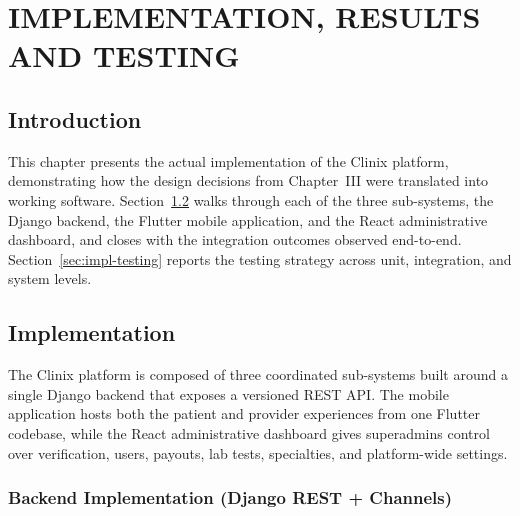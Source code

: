 \chapter{IMPLEMENTATION, RESULTS AND TESTING}

\section{Introduction}

This chapter presents the actual implementation of the Clinix platform, demonstrating how the design decisions from Chapter~III were translated into working software. Section~\ref{sec:impl-implementation} walks through each of the three sub-systems, the Django backend, the Flutter mobile application, and the React administrative dashboard, and closes with the integration outcomes observed end-to-end. Section~\ref{sec:impl-testing} reports the testing strategy across unit, integration, and system levels.

\section{Implementation}
\label{sec:impl-implementation}

The Clinix platform is composed of three coordinated sub-systems built around a single Django backend that exposes a versioned REST API. The mobile application hosts both the patient and provider experiences from one Flutter codebase, while the React administrative dashboard gives superadmins control over verification, users, payouts, lab tests, specialties, and platform-wide settings.

\subsection{Backend Implementation (Django REST + Channels)}

